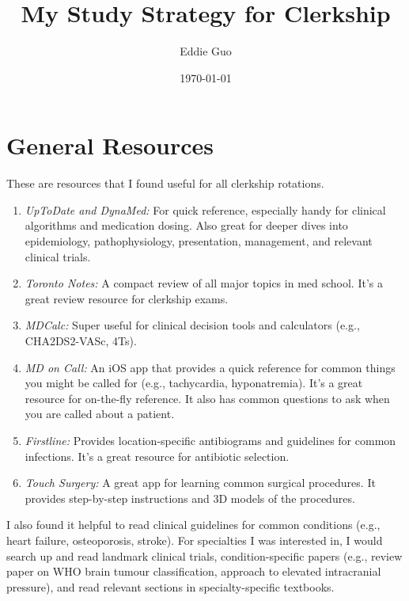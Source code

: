 \documentclass{article}
\begin{document}
\title{My Study Strategy for Clerkship}
\author{Eddie Guo}
\date{\today}

\maketitle

\section*{General Resources}
These are resources that I found useful for all clerkship rotations.
\begin{enumerate}
    \item \textit{UpToDate and DynaMed:} For quick reference, especially handy for clinical algorithms and medication dosing. Also great for deeper dives into epidemiology, pathophysiology, presentation, management, and relevant clinical trials.
    \item \textit{Toronto Notes:} A compact review of all major topics in med school. It's a great review resource for clerkship exams.
    \item \textit{MDCalc:} Super useful for clinical decision tools and calculators (e.g., CHA2DS2-VASc, 4Ts).
    \item \textit{MD on Call:} An iOS app that provides a quick reference for common things you might be called for (e.g., tachycardia, hyponatremia). It's a great resource for on-the-fly reference. It also has common questions to ask when you are called about a patient.
    \item \textit{Firstline:} Provides location-specific antibiograms and guidelines for common infections. It's a great resource for antibiotic selection.
    \item \textit{Touch Surgery:} A great app for learning common surgical procedures. It provides step-by-step instructions and 3D models of the procedures.
\end{enumerate}

I also found it helpful to read clinical guidelines for common conditions (e.g., heart failure, osteoporosis, stroke). For specialties I was interested in, I would search up and read landmark clinical trials, condition-specific papers (e.g., review paper on WHO brain tumour classification, approach to elevated intracranial pressure), and read relevant sections in specialty-specific textbooks. \vspace{1em}
\end{document}

